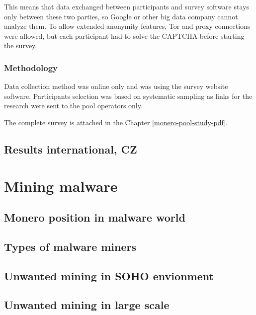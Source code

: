\documentclass[
  printed, %
  table,   %
  nolof,     %
  nolot,     %
           oneside, color
]{fithesis3}
\begin{document}
This means that data exchanged between participants and survey software stays only between these two parties, so Google or other big data company cannot analyze them. To allow extended anonymity features, Tor and proxy connections were allowed, but each participant had to solve the CAPTCHA before starting the survey.
\subsection{Methodology}
Data collection method was online only and was using the survey website software. Participants selection was based on systematic sampling as links for the research were sent to the pool operators only.

The complete survey is attached in the Chapter \ref{monero-pool-study-pdf}.
\section{Results international, CZ}

\fi
\chapter{Mining malware}
\section{Monero position in malware world}
\section{Types of malware miners}
\section{Unwanted mining in SOHO envionment}
\section{Unwanted mining in large scale}


\end{document}
